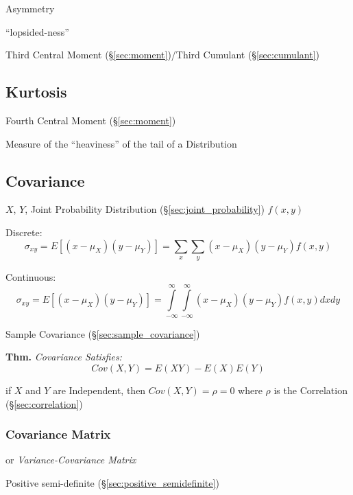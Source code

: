 Asymmetry %

``lopsided-ness''

Third Central Moment (\S\ref{sec:moment})/Third Cumulant (\S\ref{sec:cumulant})



\subsection{Kurtosis}\label{sec:kurtosis}

Fourth Central Moment (\S\ref{sec:moment})

 Measure of the ``heaviness'' of the tail of a Distribution



\subsection{Covariance}\label{sec:covariance}

$X$, $Y$, Joint Probability Distribution
(\S\ref{sec:joint_probability}) $f(x,y)$

Discrete:
\[
  \sigma_{xy} = E [(x - \mu_X)(y - \mu_Y)] = \sum_x \sum_y (x - \mu_X)
  (y - \mu_Y) f(x,y)
\]

Continuous:
\[
  \sigma_{xy} = E [(x - \mu_X)(y - \mu_Y)] =
  \int\limits_{-\infty}^{\infty} \int\limits_{-\infty}^{\infty}
  (x - \mu_X) (y - \mu_Y) f(x,y) dx dy
\]

\fist Sample Covariance (\S\ref{sec:sample_covariance})

\textbf{Thm.} \emph{Covariance Satisfies:
  \[
    Cov(X,Y) = E(XY) - E(X)E(Y)
  \]
}

if $X$ and $Y$ are Independent, then $Cov(X,Y) = \rho = 0$ where $\rho$ is the
Correlation (\S\ref{sec:correlation})



\subsubsection{Covariance Matrix}\label{sec:covariance_matrix}

or \emph{Variance-Covariance Matrix}

Positive semi-definite (\S\ref{sec:positive_semidefinite})



